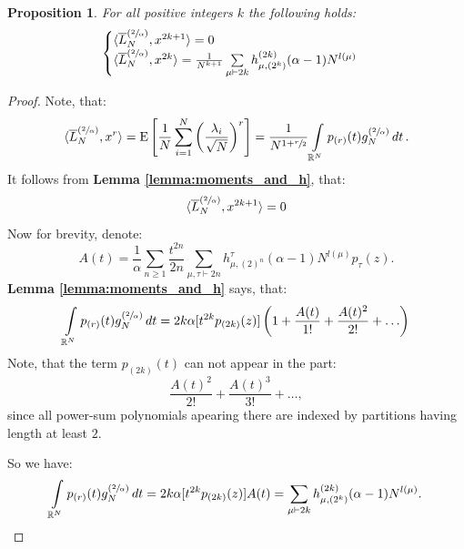\documentclass{article}
\newtheorem{proposition}{Proposition}
\newcommand{\E}{\mathrm{E}}
\begin{document}
\begin{proposition}\label{prop:moments_and_h}
    For all positive integers $k$ the following holds:
    \begin{equation}
        \begin{cases}
        \langle \overline{L}_{N}^{(\sfrac{2}{\alpha})}, x^{2k + 1} \rangle = 0 \\
        \langle \overline{L}_{N}^{(\sfrac{2}{\alpha})}, x^{2k} \rangle = \frac{1}{N^{k + 1}}\sum\limits_{\mu \vdash 2k}h_{\mu, (2^k)}^{(2k)}(\alpha - 1)N^{l(\mu)}
        \end{cases}
    \end{equation}
\end{proposition}
\begin{proof}
    Note, that:
    $$
        \langle \overline{L}_{N}^{(\sfrac{2}{\alpha})}, x^{r} \rangle = \E\left[\frac{1}{N}\sum\limits_{i = 1}^N\left(\frac{\lambda_i}{\sqrt{N}}\right)^r\right] = \frac{1}{N^{1 + \sfrac{r}{2}}}\int\limits_{\mathbb{R}^N}p_{(r)}(t)g_N^{(\sfrac{2}{\alpha})}\mathop{dt}.
        $$
        \todo{$\E$ is not defined}
    It follows from \textbf{Lemma \ref{lemma:moments_and_h}}, that:
    $$
        \langle \overline{L}_{N}^{(\sfrac{2}{\alpha})}, x^{2k + 1} \rangle = 0
    $$
    Now for brevity, denote:
    $$
        A(t) = \frac{1}{\alpha}\sum\limits_{n \geq 1}\frac{t^{2n}}{2n}\sum\limits_{\mu, \tau \vdash 2n}h_{\mu, (2)^n}^{\tau}(\alpha - 1)N^{l(\mu)}p_{\tau}(z).
    $$
    \textbf{Lemma \ref{lemma:moments_and_h}} says, that:
    $$
        \int\limits_{\mathbb{R}^N}p_{(r)}(t)g_N^{(\sfrac{2}{\alpha})}\mathop{dt} = 2k\alpha[t^{2k}p_{(2k)}(z)]\left(1 + \frac{A(t)}{1!} + \frac{A(t)^2}{2!} + \ldots \right)
    $$
    Note, that the term $p_{(2k)}(t)$ can not appear in the part:
    $$
        \frac{A(t)^2}{2!} + \frac{A(t)^3}{3!} + \ldots , 
    $$
    since all power-sum polynomials apearing there are indexed by partitions having length at least $2$.
    
    So we have:
    \begin{equation}\label{eq:mixed_moments_and_h}
        \int\limits_{\mathbb{R}^N}p_{(r)}(t)g_N^{(\sfrac{2}{\alpha})}\mathop{dt} = 2k\alpha[t^{2k}p_{(2k)}(z)]A(t) = \sum\limits_{\mu \vdash 2k}h_{\mu, (2^k)}^{(2k)}(\alpha - 1)N^{l(\mu)}.
    \end{equation}
\end{proof}
\end{document}
